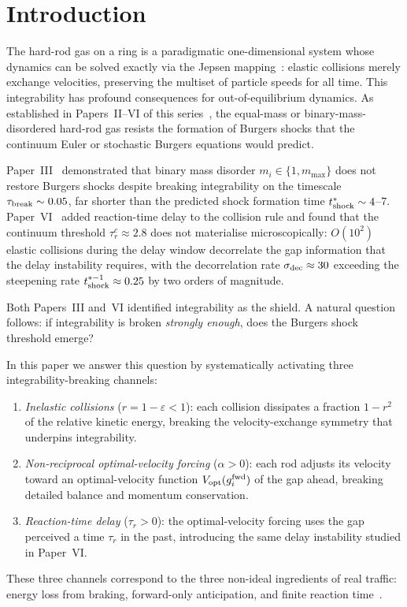 \documentclass[aps,pre,twocolumn,superscriptaddress,longbibliography,floatfix]{revtex4-2}
\begin{document}
\section{Introduction}
\label{sec:intro}

The hard-rod gas on a ring is a paradigmatic one-dimensional
system whose dynamics can be solved exactly via the Jepsen
mapping~\cite{Jepsen1965}: elastic collisions merely exchange
velocities, preserving the multiset of particle speeds for all
time. This integrability has profound consequences for
out-of-equilibrium dynamics. As established in
Papers~II--VI of this
series~\cite{PaperII,PaperIII,PaperIV,PaperV,PaperVI}, the
equal-mass or binary-mass-disordered hard-rod gas resists the
formation of Burgers shocks that the continuum Euler or
stochastic Burgers equations would predict.

Paper~III~\cite{PaperIII} demonstrated that binary mass disorder
$m_i \in \{1, m_{\max}\}$ does not restore Burgers shocks despite
breaking integrability on the timescale $\tau_{\rm break} \sim
0.05$, far shorter than the predicted shock formation time
$t^*_{\rm shock} \sim 4$--$7$. Paper~VI~\cite{PaperVI} added
reaction-time delay to the collision rule and found that the
continuum threshold $\tau_r^c \approx 2.8$ does not materialise
microscopically: $O(10^2)$ elastic collisions during the delay
window decorrelate the gap information that the delay instability
requires, with the decorrelation rate $\sigma_{\rm dec} \approx
30$ exceeding the steepening rate $t^{*-1}_{\rm shock} \approx
0.25$ by two orders of magnitude.

Both Papers~III and~VI identified integrability as the
shield. A natural question follows: if integrability is broken
\emph{strongly enough}, does the Burgers shock threshold emerge?

In this paper we answer this question by systematically activating
three integrability-breaking channels:
\begin{enumerate}
\item[(a)] \emph{Inelastic collisions} ($r = 1 - \varepsilon <
1$): each collision dissipates a fraction $1 - r^2$ of the
relative kinetic energy, breaking the velocity-exchange symmetry
that underpins integrability.
\item[(b)] \emph{Non-reciprocal optimal-velocity forcing}
($\alpha > 0$): each rod adjusts its velocity toward an
optimal-velocity function $V_{\rm opt}(g_i^{\rm fwd})$ of the gap
ahead, breaking detailed balance and momentum conservation.
\item[(c)] \emph{Reaction-time delay} ($\tau_r > 0$): the
optimal-velocity forcing uses the gap perceived a time $\tau_r$ in
the past, introducing the same delay instability studied in
Paper~VI.
\end{enumerate}
These three channels correspond to the three non-ideal ingredients
of real traffic: energy loss from braking, forward-only
anticipation, and finite reaction
time~\cite{Bando1995,Sugiyama2008}.
\end{document}
